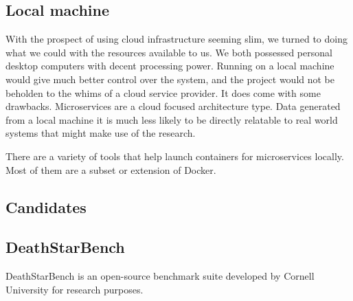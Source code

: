 \subsection{Local machine}
With the prospect of using cloud infrastructure seeming slim, we turned to doing what we could with the resources available to us. We both possessed personal desktop computers with decent processing power. 
Running on a local machine would give much better control over the system, and the project would not be beholden to the whims of a cloud service provider. 
It does come with some drawbacks. Microservices are a cloud focused architecture type. Data generated from a local machine it is much less likely to be directly relatable to real world systems that might make use of the research.

There are a variety of tools that help launch containers for microservices locally. Most of them are a subset or extension of Docker. 

\subsection{Candidates}
\subsection*{DeathStarBench}
DeathStarBench is an open-source benchmark suite developed by Cornell University for research purposes. 